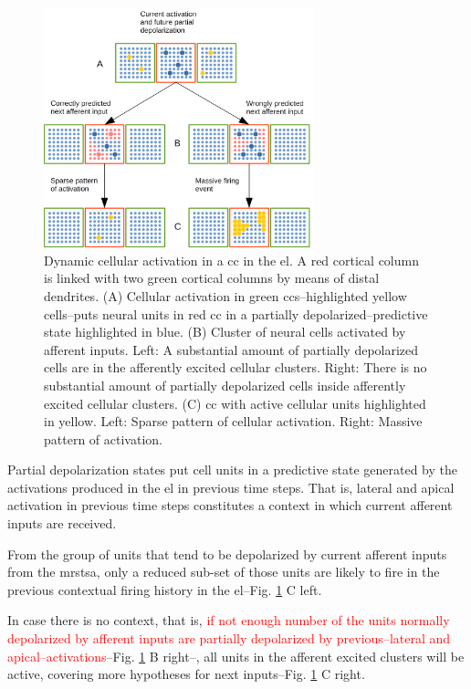 \documentclass[10pt,letterpaper]{article}
\begin{document}
\begin{figure}[h!]
    \centering
    \includegraphics[width=0.7\textwidth]{Activation.png}
    \caption{Dynamic cellular activation in a \gls{cc} in the \gls{el}.
    A red cortical column is linked with two green cortical columns by means of distal dendrites.
    (A) Cellular activation in green \glspl{cc}--highlighted yellow cells--puts neural units
    in red \gls{cc} in a partially depolarized--predictive state highlighted in blue.
    (B) Cluster of neural cells activated by afferent inputs.
    Left: A substantial amount of partially depolarized cells are in the afferently excited cellular clusters.
    Right: There is no substantial amount of partially depolarized cells inside afferently excited cellular clusters.
    (C) \gls{cc} with active cellular units highlighted in yellow.
    Left: Sparse pattern of cellular activation.
    Right: Massive pattern of activation.}
    \label{fig:Activation}
\end{figure}

\pagebreak

Partial depolarization states put cell units in a predictive state generated by
the activations produced in the \gls{el} in previous time steps.
That is, lateral and apical activation in previous time steps constitutes a context in which
current afferent inputs are received.

From the group of units that tend to be depolarized by current afferent inputs from the \gls{mrstsa},
only a reduced sub-set of those units are likely to fire in the previous contextual firing history
in the \gls{el}--Fig. \ref{fig:Activation} C left.

In case there is no context, that is, \textcolor{red}{if not enough number of the units normally depolarized by afferent inputs
are partially depolarized by previous--lateral and apical--activations}--Fig. \ref{fig:Activation} B right--,
all units in the afferent excited clusters will be active, covering more hypotheses for next inputs--Fig. \ref{fig:Activation} C right.
\end{document}
